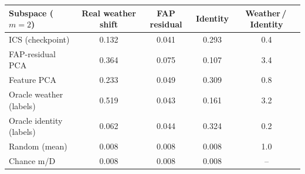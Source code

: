 \begin{tabular}{lcccc}
\toprule
Subspace ($m{=}2$) & Real weather shift & FAP residual & Identity & Weather\,/\,Identity \\
\midrule
ICS (checkpoint) & 0.132 & 0.041 & 0.293 & 0.4 \\
FAP-residual PCA & 0.364 & 0.075 & 0.107 & 3.4 \\
Feature PCA & 0.233 & 0.049 & 0.309 & 0.8 \\
Oracle weather (labels) & 0.519 & 0.043 & 0.161 & 3.2 \\
Oracle identity (labels) & 0.062 & 0.044 & 0.324 & 0.2 \\
Random (mean) & 0.008 & 0.008 & 0.008 & 1.0 \\
Chance m/D & 0.008 & 0.008 & 0.008 & -- \\
\bottomrule
\end{tabular}

